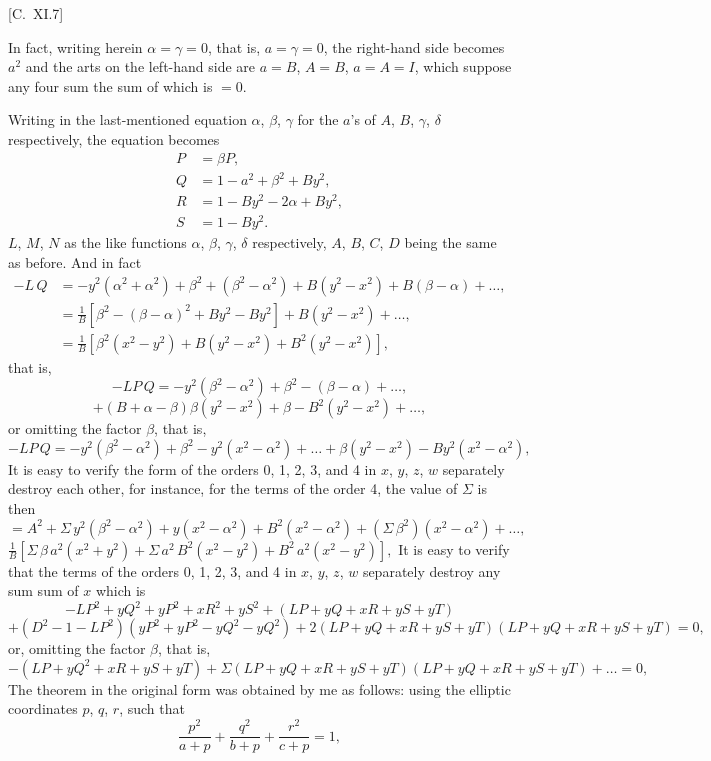 \documentclass[12pt,a4paper,oneside]{book}
\newcommand{\paperref}[1]{\par\noindent\hfill[#1]\hfill\null\par}
\theoremstyle{plain}
\theoremstyle{definition}
\theoremstyle{remark}
\begin{document}
\paperref{C.~XI.\hfill 7}

\newpage
In fact, writing herein $\alpha=\gamma=0$, that is, $a=\gamma=0$, the right-hand side becomes $a^2$ and the arts on the left-hand side are $a=B$, $A=B$, $a=A=I$, which suppose any four sum the sum of which is $=0$.

Writing in the last-mentioned equation $\alpha$, $\beta$, $\gamma$ for the $a$'s of $A$, $B$, $\gamma$, $\delta$ respectively, the equation becomes
\begin{align*}
P&=\beta P,\\
Q&=1-a^2+\beta^2+By^2,\\
R&=1-By^2-2\alpha+By^2,\\
S&=1-By^2.
\end{align*}
$L$, $M$, $N$ as the like functions $\alpha$, $\beta$, $\gamma$, $\delta$ respectively, $A$, $B$, $C$, $D$ being the same as before. And in fact
\begin{align*}
-L\,Q&=-y^2(\alpha^2+\alpha^2)+\beta^2+(\beta^2-\alpha^2)+B(y^2-x^2)+B(\beta-\alpha)+\dots,\\
&=\frac{1}{B}\left[\beta^2-(\beta-\alpha)^2+By^2-By^2\right]+B(y^2-x^2)+\dots,\\
&=\frac{1}{B}\left[\beta^2(x^2-y^2)+B(y^2-x^2)+B^2(y^2-x^2)\right],
\end{align*}
that is,
\[
-LP\,Q=-y^2(\beta^2-\alpha^2)+\beta^2-(\beta-\alpha)+\dots,
\]
\[
+(B+\alpha-\beta)\beta(y^2-x^2)+\beta-B^2(y^2-x^2)+\dots,
\]
or omitting the factor $\beta$, that is,
\[
-LP\,Q=-y^2(\beta^2-\alpha^2)+\beta^2-y^2(x^2-\alpha^2)+\dots+\beta(y^2-x^2)-By^2(x^2-\alpha^2),
\]
It is easy to verify the form of the orders 0, 1, 2, 3, and 4 in $x$, $y$, $z$, $w$ separately destroy each other, for instance, for the terms of the order 4, the value of $\Sigma$ is then
\[
=A^2+\Sigma\,y^2(\beta^2-\alpha^2)+y(x^2-\alpha^2)+B^2(x^2-\alpha^2)+(\Sigma\,\beta^2)(x^2-\alpha^2)+\dots,
\]
$\frac{1}{B}\left[\Sigma\,\beta\,a^2(x^2+y^2)+\Sigma\,a^2\,B^2(x^2-y^2)+B^2\,a^2(x^2-y^2)\right],$
It is easy to verify that the terms of the orders 0, 1, 2, 3, and 4 in $x$, $y$, $z$, $w$ separately destroy any sum sum of $x$ which is
\[
-LP^2+yQ^2+yP^2+xR^2+yS^2+(LP+yQ+xR+yS+yT)
\]
\[
+(D^2-1-LP^2)(yP^2+yP^2-yQ^2-yQ^2)+2(LP+yQ+xR+yS+yT)(LP+yQ+xR+yS+yT)=0,
\]
or, omitting the factor $\beta$, that is,
\[
-(LP+yQ^2+xR+yS+yT)+\Sigma(LP+yQ+xR+yS+yT)(LP+yQ+xR+yS+yT)+\dots=0,
\]
The theorem in the original form was obtained by me as follows: using the elliptic coordinates $p$, $q$, $r$, such that
\[
\frac{p^2}{a+p}+\frac{q^2}{b+p}+\frac{r^2}{c+p}=1,
\]
\end{document}

